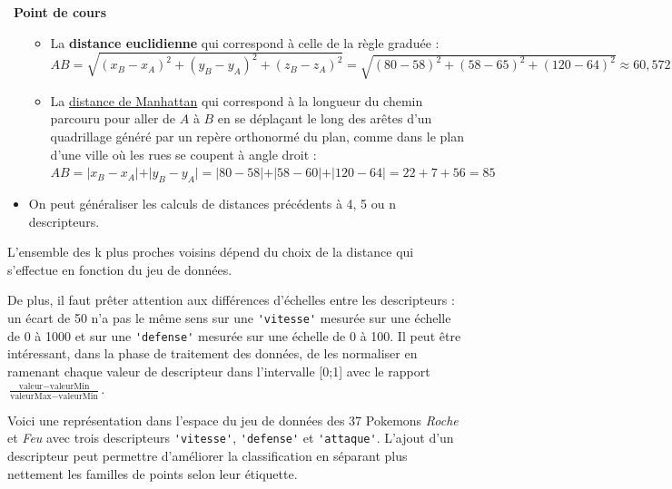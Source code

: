 \documentclass[
  11pt,
]{article}
\newcommand{\passthrough}[1]{#1}
\providecommand{\tightlist}{%
  \setlength{\itemsep}{0pt}\setlength{\parskip}{0pt}}
\newcounter{def}
\newcounter{cours}
\newenvironment{cours}[1]
{\par \medskip   \addtocounter{cours}{1} \noindent  
\begin{bclogo}[arrondi =0.1,  ombre = true, barre=none, logo=\bcbook, marge=4]{~\textbf{Point de cours} \textbf{\thecours} {\itshape #1} }  \par}
{
\end{bclogo}
 \par \bigskip }
\begin{document}
\begin{cours}{}
\begin{itemize}
  \begin{itemize}
  \tightlist
  \item
    La \textbf{distance euclidienne} qui correspond à celle de la règle
    graduée :\\
    \(AB=\sqrt{(x_{B}-x_{A})^{2}+(y_{B}-y_{A})^{2} + (z_{B}-z_{A})^{2}}=\sqrt{(80-58)^{2}+ (58-65)^{2} + (120 - 64)^{2}} \approx 60,572\)
  \item
    La
    \href{https://fr.wikipedia.org/wiki/Distance_de_Manhattan}{distance
    de Manhattan} qui correspond à la longueur du chemin parcouru pour
    aller de \(A\) à \(B\) en se déplaçant le long des arêtes d'un
    quadrillage généré par un repère orthonormé du plan, comme dans le
    plan d'une ville où les rues se coupent à angle droit :
    \(AB=\vert x_{B}-x_{A} \vert + \vert y_{B}-y_{A} \vert =\vert 80 - 58 \vert + \vert 58 - 60 \vert + \vert 120 - 64 \vert = 22 + 7 + 56 = 85\)
  \end{itemize}
\item
  On peut généraliser les calculs de distances précédents à 4, 5 ou n
  descripteurs.
\end{itemize}

L'ensemble des k plus proches voisins dépend du choix de la distance qui
s'effectue en fonction du jeu de données.

De plus, il faut prêter attention aux différences d'échelles entre les
descripteurs : un écart de 50 n'a pas le même sens sur une
\passthrough{\lstinline!'vitesse'!} mesurée sur une échelle de 0 à 1000
et sur une \passthrough{\lstinline!'defense'!} mesurée sur une échelle
de 0 à 100. Il peut être intéressant, dans la phase de traitement des
données, de les normaliser en ramenant chaque valeur de descripteur dans
l'intervalle {[}0;1{]} avec le rapport
\(\frac{\text{valeur}-\text{valeurMin}}{\text{valeurMax}-\text{valeurMin}}\).

\end{cours}

Voici une représentation dans l'espace du jeu de données des 37 Pokemons
\emph{Roche} et \emph{Feu} avec trois descripteurs
\passthrough{\lstinline!'vitesse'!}, \passthrough{\lstinline!'defense'!}
et \passthrough{\lstinline!'attaque'!}. L'ajout d'un descripteur peut
permettre d'améliorer la classification en séparant plus nettement les
familles de points selon leur étiquette.
\end{document}
